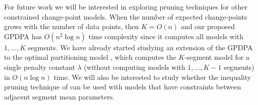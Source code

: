 \documentclass{article}
\begin{document}
For future work we will be interested in exploring pruning techniques
for other constrained change-point models. When the number of expected
change-points grows with the number of data points, then $K=O(n)$ and
our proposed GPDPA has $O(n^2 \log n)$ time complexity since it
computes all models with $1,\dots,K$ segments. We have already started
studying an extension of the GPDPA to the optimal partitioning model
\citep{optimal-partitioning}, which computes the $K$-segment model for a
single penalty constant $\lambda$ (without computing models
with $1,\dots,K-1$ segments) in $O(n\log n)$ time. We will also be
interested to study whether the inequality pruning technique of
\citet{pelt} can be used with models that have constraints between
adjacent segment mean parameters.


\newpage

\end{document}
